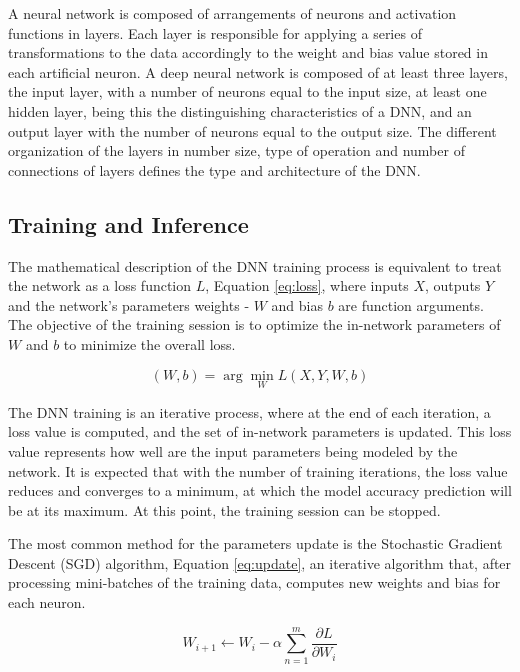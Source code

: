 A neural network is composed of arrangements of neurons and activation functions in layers. Each layer is responsible for applying a series of transformations to the data accordingly to the weight and bias value stored in each artificial neuron. A deep neural network is composed of at least three layers, the input layer, with a number of neurons equal to the input size, at least one hidden layer, being this the distinguishing characteristics of a DNN, and an output layer with the number of neurons equal to the output size. The different organization of the layers in number size, type of operation and number of connections of layers defines the type and architecture of the DNN.

\subsection{Training and Inference}
The mathematical description of the  DNN training process is equivalent to treat the network as a loss function $L$, Equation \ref{eq:loss}, where inputs $X$, outputs $Y$ and the network's parameters weights - $W$ and bias $b$ are function arguments. The objective of the training session is to optimize the in-network parameters of $W$ and $b$ to minimize the overall loss.

\begin{equation}
    \label{eq:loss}
    (W,b) = \arg\min_{W} L(X,Y,W,b)
\end{equation}

The DNN training is an iterative process, where at the end of each iteration, a loss value is computed, and the set of in-network parameters is updated. This loss value represents how well are the input parameters being modeled by the network. It is expected that with the number of training iterations, the loss value reduces and converges to a minimum, at which the model accuracy prediction will be at its maximum. At this point, the training session can be stopped.

The most common method for the parameters update is the Stochastic Gradient Descent (SGD) algorithm, Equation \ref{eq:update}, an iterative algorithm that, after processing mini-batches of the training data, computes new weights and bias for each neuron. 

\begin{equation}
    \label{eq:update}
    W_{i+1} \xleftarrow{} W_i - \alpha \sum_{n=1}^{m}\frac{\partial L}{\partial W_i}
\end{equation}

